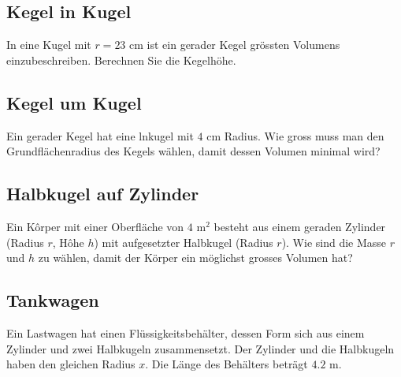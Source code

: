 

\subsection{Kegel in Kugel}
In eine Kugel mit $r = 23 \text{ cm}$ ist ein gerader Kegel grössten Volumens einzubeschreiben. Berechnen Sie die Kegelhöhe.




\subsection{Kegel um Kugel}

Ein gerader Kegel hat eine lnkugel mit $4 \text{ cm}$
Radius. Wie gross muss man den Grundflächenradius des Kegels wählen, damit dessen Volumen minimal wird?




\subsection{Halbkugel auf Zylinder}
Ein Kôrper mit einer Oberfläche von $4 \text{ m}^2$ besteht aus einem geraden Zylinder (Radius $r$, Hôhe $h$) mit aufgesetzter Halbkugel (Radius $r$). Wie sind die Masse $r$ und $h$ zu wählen, damit der Körper ein möglichst grosses Volumen hat?


\subsection{Tankwagen}

Ein Lastwagen hat einen Flüssigkeitsbehälter, dessen
Form sich aus einem Zylinder und zwei Halbkugeln zusammensetzt. Der Zylinder und die Halbkugeln haben den
gleichen Radius $x$. Die Länge des Behälters beträgt $4.2 \text{ m}$.


